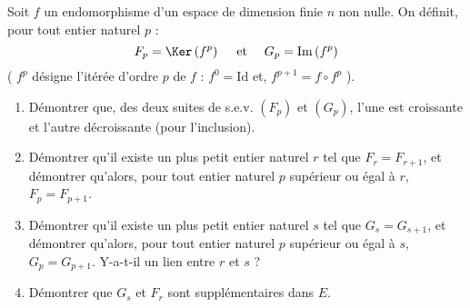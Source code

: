 Soit $f$ un endomorphisme d'un espace de dimension finie $n$ non nulle. On définit, pour tout entier naturel $p$ :
$$
F_p=\Ker\left(f^p\right) \quad \text { et } \quad G_p=\operatorname{Im}\left(f^p\right)
$$
( $f^p$ désigne l'itérée d'ordre $p$ de $f$ : $f^0=\mathrm{Id}$ et, $f^{p+1}=f \circ f^p$ ).
\begin{enumerate}
\item Démontrer que, des deux suites de s.e.v. $\left(F_p\right)$ et $\left(G_p\right)$, l'une est croissante et l'autre décroissante (pour l'inclusion).
\item Démontrer qu'il existe un plus petit entier naturel $r$ tel que $F_r=F_{r+1}$, et démontrer qu'alors, pour tout entier naturel $p$ supérieur ou égal à $r$, $F_p=F_{p+1}$.
\item Démontrer qu'il existe un plus petit entier naturel $s$ tel que $G_s=G_{s+1}$, et démontrer qu'alors, pour tout entier naturel $p$ supérieur ou égal à $s$, $G_p=G_{p+1}$. Y-a-t-il un lien entre $r$ et $s$ ?
\item Démontrer que $G_s$ et $F_r$ sont supplémentaires dans $E$.
\end{enumerate}
